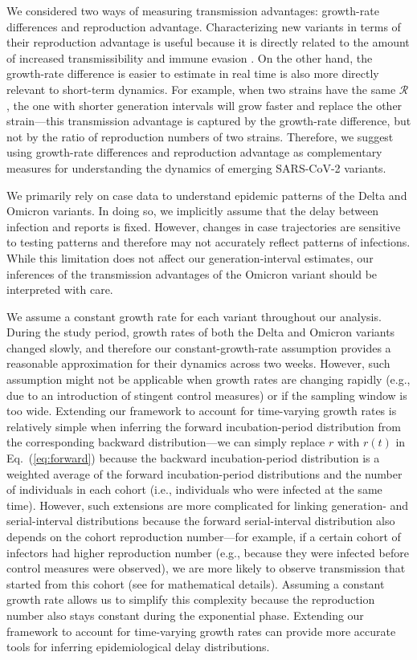 \documentclass[12pt]{article}
\newcommand{\eref}[1]{Eq.~(\ref{eq:#1})}
\newcommand{\RR}{\ensuremath{{\mathcal R}}\xspace}
\begin{document}
We considered two ways of measuring transmission advantages: growth-rate differences and reproduction advantage.
Characterizing new variants in terms of their reproduction advantage is useful because it is directly related to the amount of increased transmissibility and immune evasion \citep{pearson2021bounding}.
On the other hand, the growth-rate difference is easier to estimate in real time is also more directly relevant to short-term dynamics. 
For example, when two strains have the same $\RR$, the one with shorter generation intervals will grow faster and replace the other strain---this transmission advantage is captured by the growth-rate difference, but not by the ratio of reproduction numbers of two strains.
Therefore, we suggest using growth-rate differences and reproduction advantage as complementary measures for understanding the dynamics of emerging SARS-CoV-2 variants.

We primarily rely on case data to understand epidemic patterns of the Delta and Omicron variants.
In doing so, we implicitly assume that the delay between infection and reports is fixed.
However, changes in case trajectories are sensitive to testing patterns and therefore may not accurately reflect patterns of infections.
While this limitation does not affect our generation-interval estimates, our inferences of the transmission advantages of the Omicron variant should be interpreted with care.

We assume a constant growth rate for each variant throughout our analysis.
During the study period, growth rates of both the Delta and Omicron variants changed slowly, and therefore our constant-growth-rate assumption provides a reasonable approximation for their dynamics across two weeks.
However, such assumption might not be applicable when growth rates are changing rapidly (e.g., due to an introduction of stingent control measures) or if the sampling window is too wide.
Extending our framework to account for time-varying growth rates is relatively simple when inferring the forward incubation-period distribution from the corresponding backward distribution---we can simply replace $r$ with $r(t)$ in \eref{forward} because the backward incubation-period distribution is a weighted average of the forward incubation-period distributions and the number of individuals in each cohort (i.e., individuals who were infected at the same time).
However, such extensions are more complicated for linking generation- and serial-interval distributions because the forward serial-interval distribution also depends on the cohort reproduction number---for example, if a certain cohort of infectors had higher reproduction number (e.g., because they were infected before control measures were observed), we are more likely to observe transmission that started from this cohort (see \citep{park2021forward} for mathematical details).
Assuming a constant growth rate allows us to simplify this complexity because the reproduction number also stays constant during the exponential phase.
Extending our framework to account for time-varying growth rates can provide more accurate tools for inferring epidemiological delay distributions.
\end{document}
